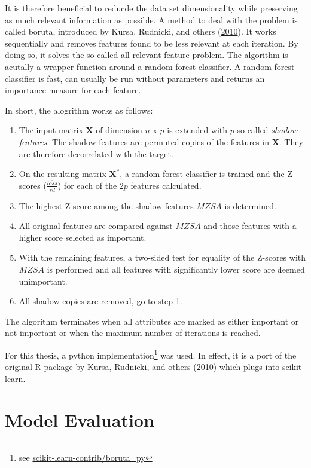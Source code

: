 \documentclass[
  11pt,
  a4paper,
  DIV=12,captions=tableheading,oneside]{scrbook}
\providecommand{\tightlist}{%
  \setlength{\itemsep}{0pt}\setlength{\parskip}{0pt}}
\providecommand{\tightlist}{%
  \setlength{\itemsep}{0pt}\setlength{\parskip}{0pt}}
\begin{document}
It is therefore beneficial to reducde the data set dimensionality while preserving as much relevant information as possible. A method to deal with the problem is called boruta, introduced by Kursa, Rudnicki, and others (\protect\hyperlink{ref-kursa2010boruta}{2010}). It works sequentially and removes features found to be less relevant at each iteration. By doing so, it solves the so-called all-relevant feature problem.
The algorithm is acutally a wrapper function around a random forest classifier. A random forest classifier is fast, can usually be run without parameters and returns an importance measure for each feature.

In short, the alogrithm works as follows:

\begin{enumerate}
\def\labelenumi{\arabic{enumi}.}
\tightlist
\item
  The input matrix \(\mathbf{X}\) of dimension \(n\text{ x }p\) is extended with \(p\) so-called \emph{shadow features}. The shadow features are permuted copies of the features in \(\mathbf{X}\). They are therefore decorrelated with the target.
\item
  On the resulting matrix \(\mathbf{X^*}\), a random forest classifier is trained and the Z-scores (\(\frac{\bar{loss}}{sd}\)) for each of the \(2p\) features calculated.
\item
  The highest Z-score among the shadow features \(MZSA\) is determined.
\item
  All original features are compared against \(MZSA\) and those features with a higher score selected as important.
\item
  With the remaining features, a two-sided test for equality of the Z-scores with \(MZSA\) is performed and all features with significantly lower score are deemed unimportant.
\item
  All shadow copies are removed, go to step 1.
\end{enumerate}

The algorithm terminates when all attributes are marked as either important or not important or when the maximum number of iterations is reached.

For this thesis, a python implementation\footnote{see \href{https://github.com/scikit-learn-contrib/boruta_py}{scikit-learn-contrib/boruta\_py}} was used. In effect, it is a port of the original R package by Kursa, Rudnicki, and others (\protect\hyperlink{ref-kursa2010boruta}{2010}) which plugs into scikit-learn.

\hypertarget{model-evaluation}{%
\section{Model Evaluation}\label{model-evaluation}}
\end{document}
